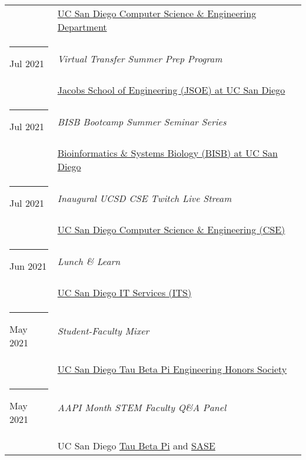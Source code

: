 \documentclass[margin,line]{res}
\begin{document}
\begin{resume}
\begin{longtable}{@{}p{0.7in}p{4in}}
\hspace*{-4mm} & \hspace{4mm} \href{https://cse.ucsd.edu/}{UC San Diego Computer Science \& Engineering Department}\\
\hspace*{-4mm} \rule{-1mm}{5mm} Jul 2021 & \textit{Virtual Transfer Summer Prep Program}\\*
\hspace*{-4mm} & \hspace{4mm} \href{https://jacobsschool.ucsd.edu/}{Jacobs School of Engineering (JSOE) at UC San Diego}\\
\hspace*{-4mm} \rule{-1mm}{5mm} Jul 2021 & \textit{BISB Bootcamp Summer Seminar Series}\\*
\hspace*{-4mm} & \hspace{4mm} \href{https://bioinformatics.ucsd.edu/}{Bioinformatics \& Systems Biology (BISB) at UC San Diego}\\
\hspace*{-4mm} \rule{-1mm}{5mm} Jul 2021 & \textit{Inaugural UCSD CSE Twitch Live Stream}\\*
\hspace*{-4mm} & \hspace{4mm} \href{https://cse.ucsd.edu/}{UC San Diego Computer Science \& Engineering (CSE)}\\
\hspace*{-4mm} \rule{-1mm}{5mm} Jun 2021 & \textit{Lunch \& Learn}\\*
\hspace*{-4mm} & \hspace{4mm} \href{https://its.ucsd.edu}{UC San Diego IT Services (ITS)}\\
\hspace*{-4mm} \rule{-1mm}{5mm} May 2021 & \textit{Student-Faculty Mixer}\\*
\hspace*{-4mm} & \hspace{4mm} \href{https://tbp.ucsd.edu/home}{UC San Diego Tau Beta Pi Engineering Honors Society}\\
\hspace*{-4mm} \rule{-1mm}{5mm} May 2021 & \textit{AAPI Month STEM Faculty Q\&A Panel}\\*
\hspace*{-4mm} & \hspace{4mm} UC San Diego \href{https://tbp.ucsd.edu/home}{Tau Beta Pi} and \href{https://saseatucsd.weebly.com/}{SASE}\\

\end{longtable}
\end{resume}
\end{document}
